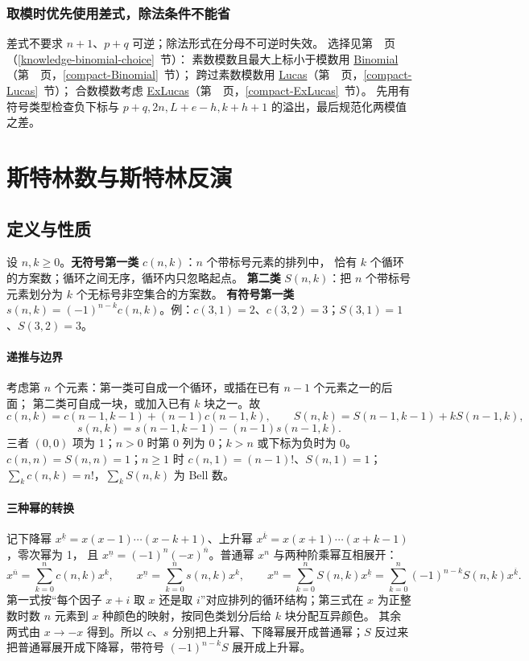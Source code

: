 \subsubsection{取模时优先使用差式，除法条件不能省}
差式不要求 $n+1$、$p+q$ 可逆；除法形式在分母不可逆时失效。
选择见第~\pageref{knowledge-binomial-choice}~页（\ref{knowledge-binomial-choice}~节）：
素数模数且最大上标小于模数用
\hyperref[compact-Binomial]{Binomial}（第~\pageref{compact-Binomial}~页，\ref{compact-Binomial}~节）；
跨过素数模数用
\hyperref[compact-Lucas]{Lucas}（第~\pageref{compact-Lucas}~页，\ref{compact-Lucas}~节）；
合数模数考虑
\hyperref[compact-ExLucas]{ExLucas}（第~\pageref{compact-ExLucas}~页，\ref{compact-ExLucas}~节）。
先用有符号类型检查负下标与 $p+q,2n,L+e-h,k+h+1$ 的溢出，最后规范化两模值之差。


\newpage

\section{斯特林数与斯特林反演}

\subsection{定义与性质}\label{knowledge-stirling-definitions}
设 $n,k\ge0$。\textbf{无符号第一类} $c(n,k)$：$n$ 个带标号元素的排列中，
恰有 $k$ 个循环的方案数；循环之间无序，循环内只忽略起点。
\textbf{第二类} $S(n,k)$：把 $n$ 个带标号元素划分为 $k$ 个无标号非空集合的方案数。
\textbf{有符号第一类} $s(n,k)=(-1)^{n-k}c(n,k)$。例：$c(3,1)=2$、$c(3,2)=3$；$S(3,1)=1$、$S(3,2)=3$。

\paragraph{递推与边界} 考虑第 $n$ 个元素：第一类可自成一个循环，或插在已有 $n-1$ 个元素之一的后面；
第二类可自成一块，或加入已有 $k$ 块之一。故
\[
 c(n,k)=c(n-1,k-1)+(n-1)c(n-1,k),\qquad
 S(n,k)=S(n-1,k-1)+kS(n-1,k),
\]
\[
 s(n,k)=s(n-1,k-1)-(n-1)s(n-1,k).
\]
三者 $(0,0)$ 项为 1；$n>0$ 时第 0 列为 0；$k>n$ 或下标为负时为 0。
$c(n,n)=S(n,n)=1$；$n\ge1$ 时 $c(n,1)=(n-1)!$、$S(n,1)=1$；$\sum_k c(n,k)=n!$，$\sum_k S(n,k)$ 为 Bell 数。

\paragraph{三种幂的转换} 记下降幂 $x^{\underline{k}}=x(x-1)\cdots(x-k+1)$、上升幂 $x^{\overline{k}}=x(x+1)\cdots(x+k-1)$，零次幂为 1，
且 $x^{\underline n}=(-1)^n(-x)^{\overline n}$。普通幂 $x^n$ 与两种阶乘幂互相展开：
\[
 x^{\overline n}=\sum_{k=0}^n c(n,k)x^k,\qquad
 x^{\underline n}=\sum_{k=0}^n s(n,k)x^k,\qquad
 x^n=\sum_{k=0}^n S(n,k)x^{\underline k}
     =\sum_{k=0}^n(-1)^{n-k}S(n,k)x^{\overline k}.
\]
第一式按“每个因子 $x+i$ 取 $x$ 还是取 $i$”对应排列的循环结构；第三式在 $x$ 为正整数时数 $n$ 元素到 $x$ 种颜色的映射，按同色类划分后给 $k$ 块分配互异颜色。
其余两式由 $x\to-x$ 得到。所以 $c$、$s$ 分别把上升幂、下降幂展开成普通幂；$S$ 反过来把普通幂展开成下降幂，带符号 $(-1)^{n-k}S$ 展开成上升幂。

